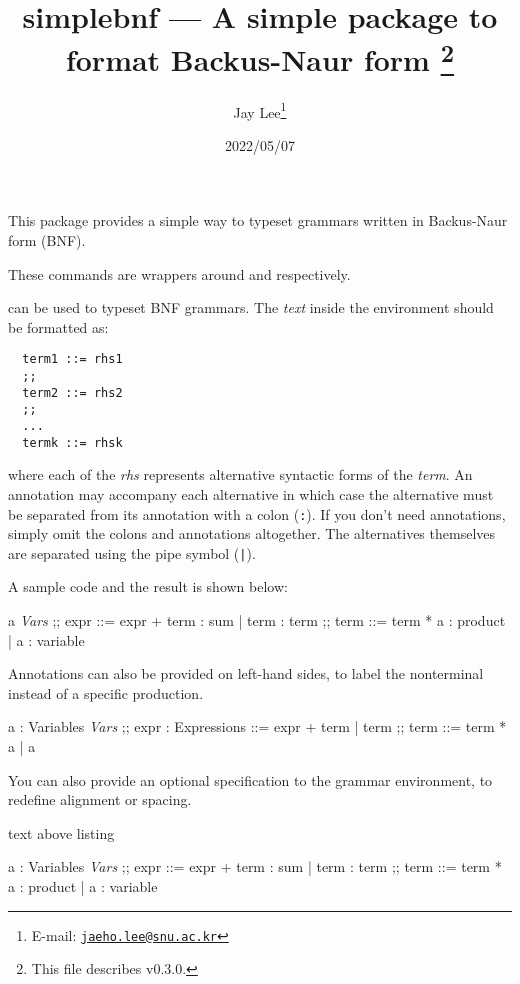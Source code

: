 \documentclass[a4paper]{article}
\title{%
  \textsf{simplebnf} --- A simple package to format Backus-Naur form%
  \footnote{This file describes v0.3.0.}}
\author{Jay Lee\footnote{E-mail: %
  \href{mailto:jaeho.lee@snu.ac.kr}{\texttt{jaeho.lee@snu.ac.kr}}}}
\date{2022/05/07}
\begin{document}
\maketitle

This package provides a simple way to typeset grammars written in Backus-Naur form (BNF).

\begin{presentcommand}
   
\end{presentcommand}
These commands are wrappers around  and  respectively.

\begin{presentcommand}
\end{presentcommand}
can be used to typeset BNF grammars. The \textit{text} inside the environment should be formatted as:
\begin{verbatim}
  term1 ::= rhs1
  ;;
  term2 ::= rhs2
  ;;
  ...
  termk ::= rhsk
\end{verbatim}
where each of the \textit{rhs} represents alternative syntactic forms of the \textit{term}. An annotation may accompany each alternative in which case the alternative must be separated from its annotation with a colon (\verb/:/). If you don't need annotations, simply omit the colons and annotations altogether. The alternatives themselves are separated using the pipe symbol (\verb/|/).

A sample code and the result is shown below:
\begin{exampleside}
  \begin{bnfgrammar}
    a \in \textit{Vars}
    ;;
    expr ::=
      expr + term : sum
    | term        : term
    ;;
    term ::=
      term * a : product
    | a        : variable
  \end{bnfgrammar}
\end{exampleside}

Annotations can also be provided on left-hand sides, to label the nonterminal instead of a specific production.
\begin{exampleside}
  \begin{bnfgrammar}
    a : Variables \in \textit{Vars}
    ;;
    expr : Expressions ::=
      expr + term
    | term
    ;;
    term ::=
      term * a
    | a
  \end{bnfgrammar}
\end{exampleside}

You can also provide an optional specification to the grammar environment, to redefine alignment or spacing.
\begin{tcblisting}{text above listing}
  \begin{bnfgrammar}
    a : Variables \in \textit{Vars}
    ;;
    expr ::=
      expr + term : sum
    | term        : term
    ;;
    term ::=
      term * a : product
    | a        : variable
  \end{bnfgrammar}
\end{tcblisting}
\end{document}
